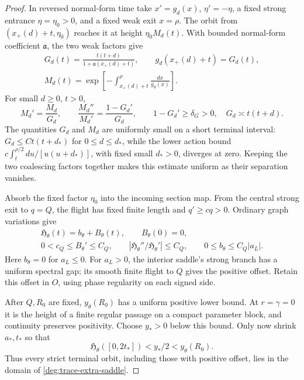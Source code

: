 \begin{proof}
In reversed normal-form time take \(x'=g_d(x)\), \(\eta'=-\eta\),
a fixed strong entrance \(\eta=\eta_0>0\), and a fixed weak exit
\(x=\rho\). The orbit from \((x_+(d)+t,\eta_0)\) reaches it at
height \(\eta_0M_d(t)\). With bounded normal-form coefficient
\(\mathfrak a\), the two weak factors give
\begin{equation}\label{deg:trace-stopped-map}
 \begin{gathered}
 G_d(t)=\frac{t(t+d)}{1+\mathfrak a(x_+(d)+t)},\qquad
 g_d(x_+(d)+t)=G_d(t),\\
 M_d(t)=\exp\!\left[-\int_{x_+(d)+t}^{\rho}\frac{dx}{g_d(x)}\right].
 \end{gathered}
\end{equation}
For small \(d\ge0\), \(t>0\),
\begin{equation}\label{deg:trace-stopped}
 M_d'=\frac{M_d}{G_d},\qquad
 \frac{M_d''}{M_d'}=\frac{1-G_d'}{G_d},\qquad
 1-G_d'\ge\delta_G>0,\quad G_d\asymp t(t+d).
\end{equation}
The quantities \(G_d\) and \(M_d\) are uniformly small on a short
terminal interval: \(G_d\le Ct(t+d_*)\) for \(0\le d\le d_*\),
while the lower action bound \(c\int_t^{\rho/2}du/[u(u+d_*)]\),
with fixed small \(d_*>0\), diverges at zero.
Keeping the two coalescing factors together makes this estimate
uniform as their separation vanishes.

Absorb the fixed factor \(\eta_0\) into the incoming section map.
From the central strong exit to \(q=Q\), the flight has fixed
finite length and \(q'\ge cq>0\).  Ordinary graph variations give
\begin{equation}\label{deg:trace-height-connector}
 \begin{gathered}
 \mathfrak H_\theta(t)=b_\theta+B_\theta(t),\qquad B_\theta(0)=0,\\
 0<c_Q\le B_\theta'\le C_Q,\qquad
 |\mathfrak H_\theta''/\mathfrak H_\theta'|\le C_Q,\qquad
 0\le b_\theta\le C_Q|a_L|.
 \end{gathered}
\end{equation}
Here \(b_\theta=0\) for \(a_L\le0\). For \(a_L>0\), the
interior saddle's strong branch has a uniform spectral gap; its
smooth finite flight to \(Q\) gives the positive offset. Retain this
offset in \(O\), using phase regularity on each signed side.

After \(Q,R_0\) are fixed, \(y_\theta(R_0)\) has a uniform
positive lower bound.  At \(r=\gamma=0\) it is the height of a
finite regular passage on a compact parameter block, and continuity
preserves positivity.  Choose \(y_*>0\) below this bound.  Only
now shrink \(a_*,t_*\) so that
\begin{equation}\label{deg:trace-domain-inclusion}
 \mathfrak H_\theta([0,2t_*])<y_*/2<y_\theta(R_0).
\end{equation}
Thus every strict terminal orbit, including those with positive
offset, lies in the domain of \eqref{deg:trace-extra-saddle}.


\end{proof}
